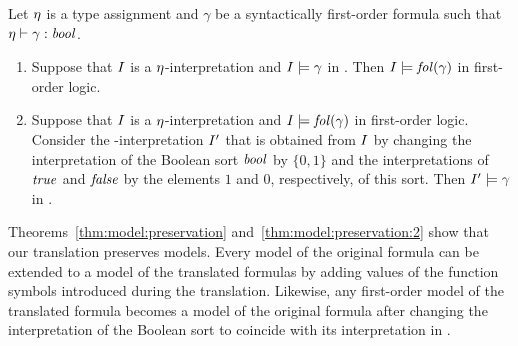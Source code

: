\begin{theorem}\label{thm:model:preservation:2}\rm
  Let $\eta$ is a type assignment and $\gamma$ be a syntactically first-order formula such that $\eta \vdash \gamma:\mathit{bool}$.
  \begin{enumerate}
  \item Suppose that $I$ is a $\eta$-interpretation and $I \models \gamma$ in \folb. Then $I \models \mathit{fol}(\gamma)$ in first-order logic.
  \item Suppose that $I$ is a $\eta$-interpretation and $I \models \mathit{fol}(\gamma)$ in first-order logic. Consider the \folb-interpretation $I'$ that is obtained from $I$ by changing the interpretation of the Boolean sort $\mathit{bool}$ by $\{0,1\}$ and the interpretations of $\mathit{true}$ and $\mathit{false}$ by the elements $1$ and $0$, respectively, of this sort. Then $I' \models \gamma$ in \folb. \QED
  \end{enumerate}
\end{theorem}

Theorems~\ref{thm:model:preservation} and~\ref{thm:model:preservation:2} show that our translation preserves models. Every model of the original formula can be extended to a model of the translated formulas by adding values of the function symbols introduced during the translation. Likewise, any first-order model of the translated formula becomes a model of the original formula after changing the interpretation of the Boolean sort to coincide with its interpretation in \folb.